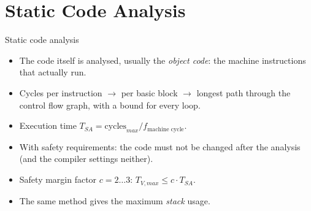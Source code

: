 \section{Static Code Analysis}
\label{sec:static}

\begin{frame}{Static code analysis}
  \begin{itemize}
    \item The code itself is analysed, usually the \emph{object code}: the machine instructions that actually run.
    \item Cycles per instruction $\rightarrow$ per basic block $\rightarrow$ longest path through the control flow graph, with a bound for every loop.
    \item Execution time $T_{SA} = \text{cycles}_{max} / f_{\text{machine cycle}}$.
    \item With safety requirements: the code must not be changed after the analysis (and the compiler settings neither).
    \item Safety margin factor $c = 2 \dots 3$: \quad $T_{V,max} \le c \cdot T_{SA}$.
    \item The same method gives the maximum \emph{stack} usage.
  \end{itemize}
\end{frame}


